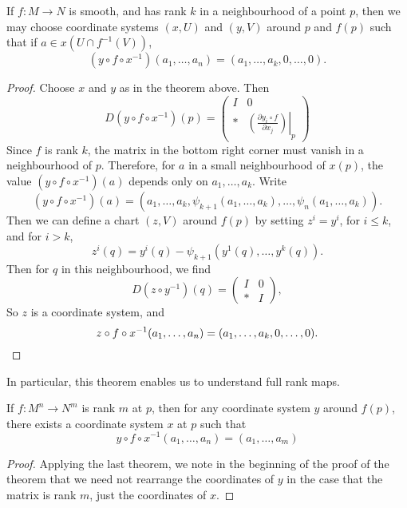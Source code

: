 \begin{corollary}
    If $f: M \to N$ is smooth, and has rank $k$ in a neighbourhood of a point $p$, then we may choose coordinate systems $(x,U)$ and $(y,V)$ around $p$ and $f(p)$ such that if $a \in x(U \cap f^{-1}(V))$,
    \[ (y \circ f \circ x^{-1})(a_1, \dots, a_n) = (a_1, \dots, a_k, 0, \dots, 0). \]
\end{corollary}
\begin{proof}
    Choose $x$ and $y$ as in the theorem above. Then
    \[ D(y \circ f \circ x^{-1})(p) = \begin{pmatrix} I & 0 \\ * & \left.\left( \frac{\partial y_i \circ f}{\partial x_j} \right)\right|_p \end{pmatrix} \]
    Since $f$ is rank $k$, the matrix in the bottom right corner must vanish in a neighbourhood of $p$. Therefore, for $a$ in a small neighbourhood of $x(p)$, the value $(y \circ f \circ x^{-1})(a)$ depends only on $a_1, \dots, a_k$. Write
    \[ (y \circ f \circ x^{-1})(a) = (a_1,\dots,a_k,\psi_{k+1}(a_1,\dots,a_k), \dots, \psi_n(a_1,\dots,a_k)). \]
    Then we can define a chart $(z,V)$ around $f(p)$ by setting $z^i = y^i$, for $i \leq k$, and for $i > k$,
    \[ z^i(q) = y^i(q) - \psi_{k+1}(y^1(q), \dots, y^k(q)). \]
    Then for $q$ in this neighbourhood, we find
    \[ D(z \circ y^{-1})(q) = \begin{pmatrix} I & 0 \\ * & I \end{pmatrix}, \]
    So $z$ is a coordinate system, and
    \[ z \circ f \circ x^{-1}(a_1, \dots, a_n) = (a_1, \dots, a_k, 0, \dots, 0). \qedhere \]
\end{proof}

In particular, this theorem enables us to understand full rank maps.

\begin{corollary}
    If $f: M^n \to N^m$ is rank $m$ at $p$, then for any coordinate system $y$ around $f(p)$, there exists a coordinate system $x$ at $p$ such that
    \[ y \circ f \circ x^{-1} (a_1, \dots, a_n) = (a_1, \dots, a_m) \]
\end{corollary}
\begin{proof}
    Applying the last theorem, we note in the beginning of the proof of the theorem that we need not rearrange the coordinates of $y$ in the case that the matrix is rank $m$, just the coordinates of $x$.
\end{proof}

